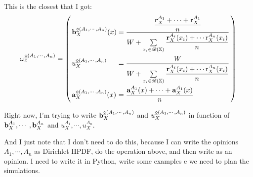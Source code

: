 \documentclass[a4paper,12pt]{article}
\theoremstyle{definition}
\theoremstyle{theorem}
\numberwithin{equation}{section}
\begin{document}
This is the closest that I got:
\begin{equation}
\arraycolsep=1.4pt\def\arraystretch{2.2}
\opia{\abfs(A_1, \cdots, A_n)}{x} =
\left(
\begin{array}{ll}
\bmdax{\abfs(A_1, \cdots, A_n)}{X}{x} & = \dfrac{\dfrac{\mathbf{r}^{A_1}_X + \cdots + \mathbf{r}^{A_1}_X}{n}}{W + \sum\limits_{x_i \in \hdom{X}} \dfrac{\mathbf{r}^{A_i}_X(x_i) + \cdots \mathrm{r}^{A_n}_X(x_i)}{n}} \\
u^{\abfs(A_1, \cdots, A_n)}_X & = \dfrac{W}{W + \sum\limits_{x_i \in \hdom{X}} \dfrac{\mathbf{r}^{A_i}_X(x_i) + \cdots \mathrm{r}^{A_n}_X(x_i)}{n}} \\
\adax{\abfs(A_1, \cdots, A_n)}{X}{x} & = \dfrac{\adax{A_1}{X}{x} + \cdots + \adax{A_1}{X}{x}}{n}
\end{array}
\right)
\end{equation}

Right now, I'm trying to write $\mathbf{b}^{\underline{\diamond}(A_1, \cdots, A_n)}_{X}$ and 
$u^{\underline{\diamond}(A_1, \cdots, A_n)}_X$ in function of $\mathbf{b}^{A_1}_{X}, \cdots, \mathbf{b}^{A_n}_{X}$ and $u^{A_1}_X, \cdots, u^{A_n}_X$.

And I just note that I don't need to do this, because I can write the opinions $A_1, \cdots, A_n$ as Dirichlet HPDF, do the operation above, and then write as an opinion. I need to write it in Python, write some examples e we need to plan the simulations.


\printbibliography
\end{document}
